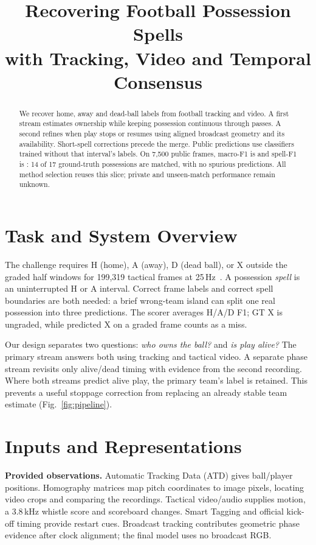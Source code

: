 \documentclass[conference,a4paper,10pt]{IEEEtran}
\title{Recovering Football Possession Spells\\with Tracking, Video and Temporal Consensus}
\author{\IEEEauthorblockN{\TeamAuthors}
 \IEEEauthorblockA{Team \TeamName\\More than a Hack 2027 --- Phase 1 Technical Document}}
\begin{document}
\maketitle

\begin{abstract}
We recover home, away and dead-ball labels from football tracking and video.
A first stream estimates ownership while keeping possession continuous through
passes. A second refines when play stops or resumes using aligned broadcast
geometry and its availability. Short-spell corrections precede the merge.
Public predictions use classifiers trained without that interval's labels.
On 7,500 public frames, macro-F1 is \MacroScore{} and spell-F1 is \SpellScore{}:
14 of 17 ground-truth possessions are matched, with no spurious predictions.
All method selection reuses this slice; private and unseen-match performance
remain unknown.
\end{abstract}

\section{Task and System Overview}
The challenge requires H (home), A (away), D (dead ball), or X outside the graded
half windows for 199,319 tactical frames at 25\,Hz~\cite{challenge}. A possession
\emph{spell} is an uninterrupted H or A interval. Correct frame labels and
correct spell boundaries are both needed: a brief wrong-team island can split
one real possession into three predictions. The scorer averages H/A/D F1;
GT X is ungraded, while predicted X on a graded frame counts as a miss.

Our design separates two questions: \emph{who owns the ball?} and \emph{is play
alive?} The primary stream answers both using tracking and tactical video.
A separate phase stream revisits only alive/dead timing with evidence from the
second recording. Where both streams predict alive play, the primary team's
label is retained. This prevents a useful stoppage correction from replacing
an already stable team estimate (Fig.~\ref{fig:pipeline}).

\section{Inputs and Representations}
\textbf{Provided observations.} Automatic Tracking Data (ATD) gives ball/player
positions. Homography matrices map pitch coordinates to image pixels, locating
video crops and comparing the recordings. Tactical video/audio supplies motion,
a 3.8\,kHz whistle score and scoreboard changes. Smart Tagging and official
kick-off timing provide restart cues. Broadcast tracking contributes geometric
phase evidence after clock alignment; the final model uses no broadcast RGB.
\end{document}
